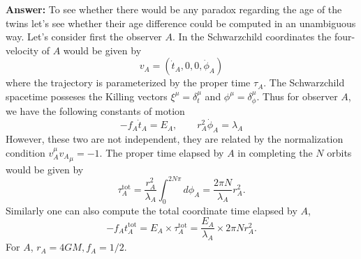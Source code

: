 \documentclass{article}
\begin{document}
\begin{enumerate}
 {\bfseries Answer:} To see whether there would be any paradox regarding the age of the twins let's see whether their age difference could be computed in an unambiguous way. Let's consider first the observer $A$. In the Schwarzchild coordinates the four-velocity of $A$ would be given by
  \begin{equation}
    \label{eq:four-velocity-A}
    v_A = (\dot{t}_A, 0, 0, \dot{\phi}_A)
  \end{equation}
  where the trajectory is parameterized by the proper time $\tau_A$. The Schwarzchild spacetime posseses the Killing vectors $\xi^\mu = \delta^\mu_t$ and $\phi^\mu = \delta^\mu_\phi$. Thus for observer $A$, we have the following constants of motion
  \begin{equation}
    \label{eq:constants-of-motion-A}
    -f_A\dot{t}_A = E_A,\qquad r_A^2\dot{\phi}_A = \lambda_A
  \end{equation}
  However, these two are not independent, they are related by the normalization condition $v_A^\mu {v_A}_\mu = -1$. The proper time elapsed by $A$ in completing the $N$ orbits would be given by
  \begin{equation}
    \label{eq:proper-time-A}
    \tau_A^{\text{tot}}=\frac{r_A^2}{\lambda_A}\int_0^{2N\pi}d\phi_A = \frac{2\pi N}{\lambda_A} r_A^2.
  \end{equation}
  Similarly one can also compute the total coordinate time elapsed by $A$,
  \begin{equation}
    \label{eq:coordinate-time-A}
    -f_At_A^{\text{tot}} = E_A \times \tau_A^{\text{tot}} = \frac{E_A}{\lambda_A}\times 2\pi N r_A^2.
  \end{equation}
  For $A$, $r_A = 4GM, f_A = 1/2$.


\end{enumerate}
\end{document}
